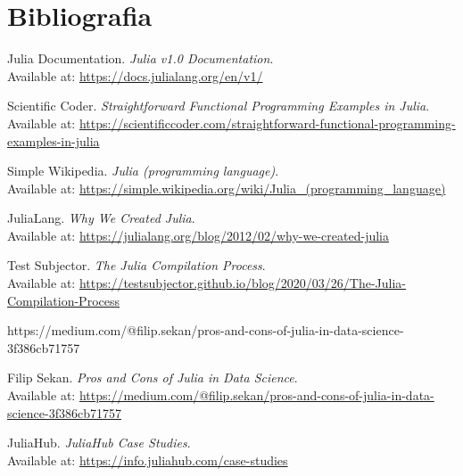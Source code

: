 \documentclass[a4paper]{article}
\begin{document}
\section{Bibliografia}
\begin{thebibliography}{9}
    \raggedright
    Julia Documentation. \textit{Julia v1.0 Documentation}.\\
    Available at: \url{https://docs.julialang.org/en/v1/}
    \vspace{0.5em}

    Scientific Coder. \textit{Straightforward Functional Programming Examples in Julia}.\\
    Available at: \url{https://scientificcoder.com/straightforward-functional-programming-examples-in-julia}
    \vspace{0.5em}

    Simple Wikipedia. \textit{Julia (programming language)}.\\
    Available at: \url{https://simple.wikipedia.org/wiki/Julia_(programming_language)}
    \vspace{0.5em}

    JuliaLang. \textit{Why We Created Julia}.\\
    Available at: \url{https://julialang.org/blog/2012/02/why-we-created-julia}
    \vspace{0.5em}

    Test Subjector. \textit{The Julia Compilation Process}.\\
    Available at: \url{https://testsubjector.github.io/blog/2020/03/26/The-Julia-Compilation-Process}

    https://medium.com/@filip.sekan/pros-and-cons-of-julia-in-data-science-3f386cb71757
    \vspace{0.5em}

    Filip Sekan. \textit{Pros and Cons of Julia in Data Science}.\\
    Available at: \url{https://medium.com/@filip.sekan/pros-and-cons-of-julia-in-data-science-3f386cb71757}

    JuliaHub. \textit{JuliaHub Case Studies}.\\
    Available at: \url{https://info.juliahub.com/case-studies}
\end{thebibliography}
\end{document}
